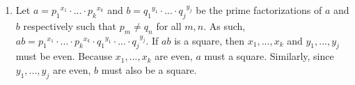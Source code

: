 \documentclass{article}
\begin{document}
\begin{enumerate}
\item Let $a = {p_1}^{x_1} \cdot  ... \cdot  {p_k}^{x_k}$ and $b = {q_1}^{y_1} \cdot  ... \cdot  {q_j}^{y_j}$ be the prime factorizations of $a$ and $b$ respectively such that $p_m \neq q_n$ for all $m, n$.  As such, $ab = {p_1}^{x_1} \cdot  ... \cdot  {p_k}^{x_k} \cdot  {q_1}^{y_1} \cdot  ... \cdot  {q_j}^{y_j}$.  If $ab$ is a square, then $x_1, ..., x_k$ and $y_1, ..., y_j$ must be even.  Because $x_1, ..., x_k$ are even, $a$ must a square.  Similarly, since $y_1, ..., y_j$ are even, $b$ must also be a square.

\end{enumerate}
\end{document}
